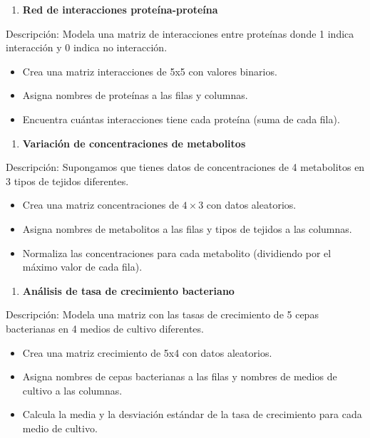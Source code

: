 \documentclass[
]{book}
\providecommand{\tightlist}{%
  \setlength{\itemsep}{0pt}\setlength{\parskip}{0pt}}
\begin{document}
\begin{enumerate}
\def\labelenumi{\arabic{enumi}.}
\setcounter{enumi}{11}
\tightlist
\item
  \textbf{Red de interacciones proteína-proteína}
\end{enumerate}

Descripción: Modela una matriz de interacciones entre proteínas donde 1 indica interacción y 0 indica no interacción.

\begin{itemize}
\tightlist
\item
  Crea una matriz interacciones de 5x5 con valores binarios.
\item
  Asigna nombres de proteínas a las filas y columnas.
\item
  Encuentra cuántas interacciones tiene cada proteína (suma de cada fila).
\end{itemize}

\begin{enumerate}
\def\labelenumi{\arabic{enumi}.}
\setcounter{enumi}{12}
\tightlist
\item
  \textbf{Variación de concentraciones de metabolitos}
\end{enumerate}

Descripción: Supongamos que tienes datos de concentraciones de 4 metabolitos en 3 tipos de tejidos diferentes.

\begin{itemize}
\tightlist
\item
  Crea una matriz concentraciones de \(4 \times 3\) con datos aleatorios.
\item
  Asigna nombres de metabolitos a las filas y tipos de tejidos a las columnas.
\item
  Normaliza las concentraciones para cada metabolito (dividiendo por el máximo valor de cada fila).
\end{itemize}

\begin{enumerate}
\def\labelenumi{\arabic{enumi}.}
\setcounter{enumi}{13}
\tightlist
\item
  \textbf{Análisis de tasa de crecimiento bacteriano}
\end{enumerate}

Descripción: Modela una matriz con las tasas de crecimiento de 5 cepas bacterianas en 4 medios de cultivo diferentes.

\begin{itemize}
\tightlist
\item
  Crea una matriz crecimiento de 5x4 con datos aleatorios.
\item
  Asigna nombres de cepas bacterianas a las filas y nombres de medios de cultivo a las columnas.
\item
  Calcula la media y la desviación estándar de la tasa de crecimiento para cada medio de cultivo.
\end{itemize}
\end{document}
